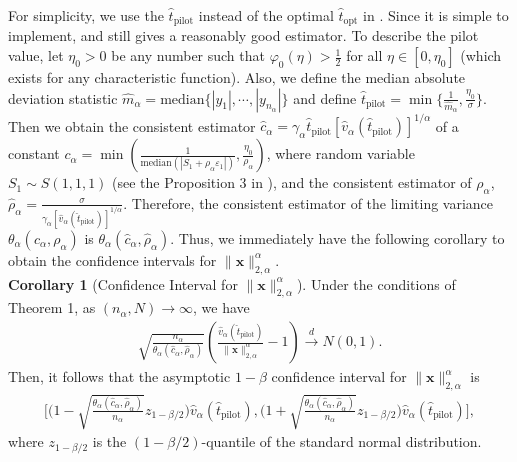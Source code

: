 \documentclass[journal,onecolumn]{IEEEtran}
\begin{document}
For simplicity, we use the $\hat{t}_{\mathrm{pilot}}$ instead of the optimal $\hat{t}_{\mathrm{opt}}$ in \cite{l2}. Since it is simple to implement, and still gives a reasonably good estimator. To describe the pilot value, let $\eta_0>0$ be any number such that $\varphi_0(\eta)>\frac{1}{2}$ for all $\eta\in[0,\eta_0]$ (which exists for
any characteristic function). Also, we define the median absolute
deviation statistic $\hat{m}_\alpha=\mathrm{median}\{|y_1|,\cdots,|y_{n_{\alpha}}|\}$ and define $\hat{t}_{\mathrm{pilot}}=\min\{\frac{1}{\hat{m}_\alpha},\frac{\eta_0}{\sigma}\}$. Then we obtain the consistent estimator $\hat{c}_\alpha=\gamma_\alpha\hat{t}_{\mathrm{pilot}}[\hat{v}_{\alpha}(\hat{t}_{\mathrm{pilot}})]^{1/\alpha}$ of a constant $c_\alpha=\min\left(\frac{1}{\mathrm{median}(|S_1+\rho_\alpha\varepsilon_1|)},\frac{\eta_0}{\rho_\alpha}\right)$, where random variable $S_1\sim S(1,1,1)$ (see the Proposition 3 in \cite{l2}), and the consistent estimator of $\rho_\alpha$, $\hat{\rho}_\alpha=\frac{\sigma}{\gamma_\alpha[\hat{v}_{\alpha}(\hat{t}_{\mathrm{pilot}})]^{1/\alpha}}$. Therefore, the consistent estimator of the limiting variance $\theta_\alpha(c_\alpha,\rho_\alpha)$ is $\theta_\alpha(\hat{c}_\alpha,\hat{\rho}_\alpha)$. Thus, we immediately have the following corollary to obtain the confidence intervals for $\lVert\mathbf{x}\rVert_{2,\alpha}^{\alpha}$.\\

\noindent
{\bf Corollary 1} (Confidence Interval for $\lVert\mathbf{x}\rVert_{2,\alpha}^{\alpha}$). Under the conditions of Theorem 1, as $(n_\alpha, N)\rightarrow \infty$, we have \begin{align}
\sqrt{\frac{n_\alpha}{\theta_\alpha(\hat{c}_\alpha,\hat{\rho}_\alpha)}}\left(\frac{\hat{v}_{\alpha}(\hat{t}_{\mathrm{pilot}})}{\lVert\mathbf{x}\rVert_{2,\alpha}^{\alpha}}-1\right)\overset{d}\longrightarrow N(0,1).
\end{align}
Then, it follows that the asymptotic $1-\beta$ confidence interval for $\lVert\mathbf{x}\rVert_{2,\alpha}^{\alpha}$ is \begin{align}
\bigg[\Big(1-\sqrt{\frac{\theta_\alpha(\hat{c}_\alpha,\hat{\rho}_\alpha)}{n_\alpha}}z_{1-\beta/2}\Big)\hat{v}_{\alpha}(\hat{t}_{\mathrm{pilot}}),
\Big(1+\sqrt{\frac{\theta_\alpha(\hat{c}_\alpha,\hat{\rho}_\alpha)}{n_\alpha}}z_{1-\beta/2}\Big)\hat{v}_{\alpha}(\hat{t}_{\mathrm{pilot}})\bigg],
\end{align}
where $z_{1-\beta/2}$ is the $(1-\beta/2)$-quantile of the standard normal distribution.\\
\end{document}
